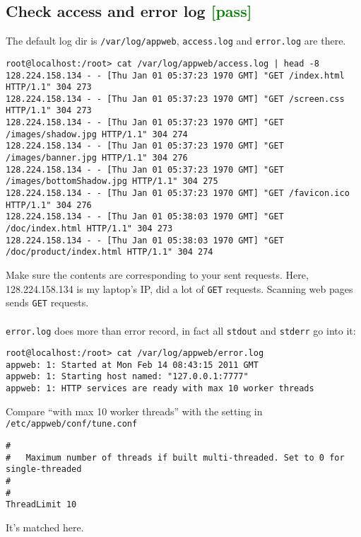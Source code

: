 \documentclass[a4paper]{report}
\begin{document}
\subsection{Check access and error log \textcolor{green}{[pass]}}
The default log dir is {\tt /var/log/appweb}, {\tt access.log} and {\tt error.log}
are there.
\begin{lstlisting}
root@localhost:/root> cat /var/log/appweb/access.log | head -8
128.224.158.134 - - [Thu Jan 01 05:37:23 1970 GMT] "GET /index.html HTTP/1.1" 304 273
128.224.158.134 - - [Thu Jan 01 05:37:23 1970 GMT] "GET /screen.css HTTP/1.1" 304 273
128.224.158.134 - - [Thu Jan 01 05:37:23 1970 GMT] "GET /images/shadow.jpg HTTP/1.1" 304 274
128.224.158.134 - - [Thu Jan 01 05:37:23 1970 GMT] "GET /images/banner.jpg HTTP/1.1" 304 276
128.224.158.134 - - [Thu Jan 01 05:37:23 1970 GMT] "GET /images/bottomShadow.jpg HTTP/1.1" 304 275
128.224.158.134 - - [Thu Jan 01 05:37:23 1970 GMT] "GET /favicon.ico HTTP/1.1" 304 276
128.224.158.134 - - [Thu Jan 01 05:38:03 1970 GMT] "GET /doc/index.html HTTP/1.1" 304 273
128.224.158.134 - - [Thu Jan 01 05:38:03 1970 GMT] "GET /doc/product/index.html HTTP/1.1" 304 274
\end{lstlisting}
Make sure the contents are corresponding to your sent requests. Here, 128.224.158.134
is my laptop's IP, did a lot of {\tt GET} requests. Scanning web pages sends {\tt GET}
requests.\\\\

{\tt error.log} does more than error record, in fact all {\tt stdout} and {\tt stderr}
go into it:
\begin{lstlisting}
root@localhost:/root> cat /var/log/appweb/error.log           
appweb: 1: Started at Mon Feb 14 08:43:15 2011 GMT
appweb: 1: Starting host named: "127.0.0.1:7777"
appweb: 1: HTTP services are ready with max 10 worker threads
\end{lstlisting}
Compare ``with max 10 worker threads'' with the setting in {\tt /etc/appweb/conf/tune.conf}
\begin{lstlisting}
#
#   Maximum number of threads if built multi-threaded. Set to 0 for single-threaded
#   
#
ThreadLimit 10
\end{lstlisting}
It's matched here.
\end{document}
